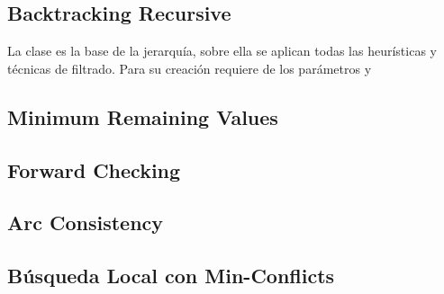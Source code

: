 \subsection{Backtracking Recursive}

La clase  es la base de la jerarqu\'ia, sobre ella se aplican todas las heur\'isticas y t\'ecnicas de filtrado. Para su creaci\'on requiere de los par\'ametros  y 

\subsection{Minimum Remaining Values}

\subsection{Forward Checking}

\subsection{Arc Consistency}

\subsection{B\'usqueda Local con Min-Conflicts}